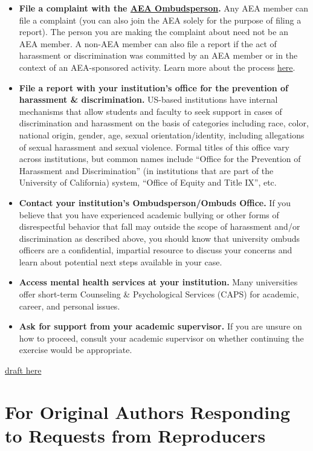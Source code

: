 \documentclass[]{book}
\providecommand{\tightlist}{%
  \setlength{\itemsep}{0pt}\setlength{\parskip}{0pt}}
\begin{document}
\begin{itemize}
\tightlist
\item
  \textbf{File a complaint with the \href{https://www.aeaweb.org/about-aea/aea-ombudsperson}{AEA Ombudsperson}.} Any AEA member can file a complaint (you can also join the AEA solely for the purpose of filing a report). The person you are making the complaint about need not be an AEA member. A non-AEA member can also file a report if the act of harassment or discrimination was committed by an AEA member or in the context of an AEA-sponsored activity. Learn more about the process \href{https://www.aeaweb.org/about-aea/aea-ombudsperson/faq}{here}.
\item
  \textbf{File a report with your institution's office for the prevention of harassment \& discrimination.} US-based institutions have internal mechanisms that allow students and faculty to seek support in cases of discrimination and harassment on the basis of categories including race, color, national origin, gender, age, sexual orientation/identity, including allegations of sexual harassment and sexual violence. Formal titles of this office vary across institutions, but common names include ``Office for the Prevention of Harassment and Discrimination'' (in institutions that are part of the University of California) system, ``Office of Equity and Title IX'', etc.
\item
  \textbf{Contact your institution's Ombudsperson/Ombuds Office.} If you believe that you have experienced academic bullying or other forms of disrespectful behavior that fall may outside the scope of harassment and/or discrimination as described above, you should know that university ombuds officers are a confidential, impartial resource to discuss your concerns and learn about potential next steps available in your case.
\item
  \textbf{Access mental health services at your institution.} Many universities offer short-term Counseling \& Psychological Services (CAPS) for academic, career, and personal issues.
\item
  \textbf{Ask for support from your academic supervisor.} If you are unsure on how to proceed, consult your academic supervisor on whether continuing the exercise would be appropriate.
\end{itemize}

\href{https://docs.google.com/document/d/1xJ7pZTQ1VQXVCrs6IUlp7HlBB4oxYha0oOniCG2SWLM/edit?ts=5d251563}{draft here}

\hypertarget{for-original-authors-responding-to-requests-from-reproducers}{%
\section{For Original Authors Responding to Requests from Reproducers}\label{for-original-authors-responding-to-requests-from-reproducers}}
\end{document}

